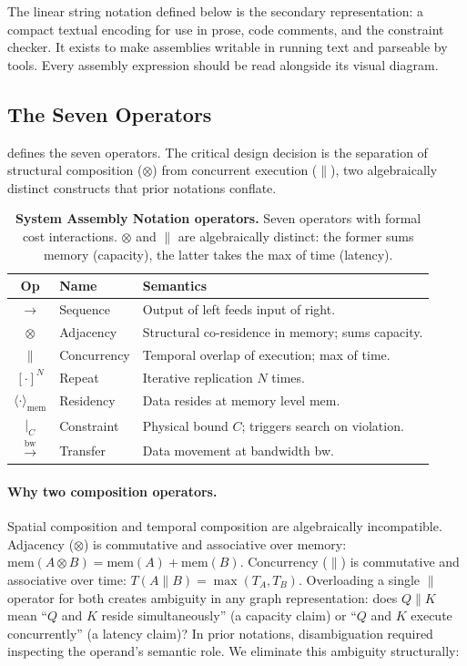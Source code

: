 \documentclass[10pt,twocolumn]{article}
\newcommand{\tablebody}{\footnotesize}
\begin{document}
The linear string notation defined below is the secondary representation: a compact textual encoding for use in prose, code comments, and the constraint checker. It exists to make assemblies writable in running text and parseable by tools. Every assembly expression should be read alongside its visual diagram.

\subsection{The Seven Operators}

 defines the seven operators. The critical design decision is the separation of structural composition ($\otimes$) from concurrent execution ($\parallel$), two algebraically distinct constructs that prior notations conflate.

\begin{table}[ht]
\tablebody
\centering
\caption{\textbf{System Assembly Notation operators.} Seven operators with formal cost interactions. $\otimes$ and $\parallel$ are algebraically distinct: the former sums memory (capacity), the latter takes the max of time (latency).}
\label{tab:operators}
\begin{tabularx}{\columnwidth}{@{} c l X @{}}
\toprule
\textbf{Op} & \textbf{Name} & \textbf{Semantics} \\
\midrule
$\rightarrow$ & Sequence & Output of left feeds input of right. \\
$\otimes$ & Adjacency & Structural co-residence in memory; sums capacity. \\
$\parallel$ & Concurrency & Temporal overlap of execution; max of time. \\
$[\cdot]^N$ & Repeat & Iterative replication $N$ times. \\
$\langle \cdot \rangle_{\text{mem}}$ & Residency & Data resides at memory level mem. \\
$\mid_C$ & Constraint & Physical bound $C$; triggers search on violation. \\
$\xrightarrow{\text{bw}}$ & Transfer & Data movement at bandwidth bw. \\
\bottomrule
\end{tabularx}
\end{table}

\paragraph{Why two composition operators.} Spatial composition and temporal composition are algebraically incompatible. Adjacency ($\otimes$) is commutative and associative over memory: $\text{mem}(A \otimes B) = \text{mem}(A) + \text{mem}(B)$. Concurrency ($\parallel$) is commutative and associative over time: $T(A \parallel B) = \max(T_A, T_B)$. Overloading a single $\parallel$ operator for both creates ambiguity in any graph representation: does $Q \parallel K$ mean ``$Q$ and $K$ reside simultaneously'' (a capacity claim) or ``$Q$ and $K$ execute concurrently'' (a latency claim)? In prior notations, disambiguation required inspecting the operand's semantic role. We eliminate this ambiguity structurally:
\end{document}
